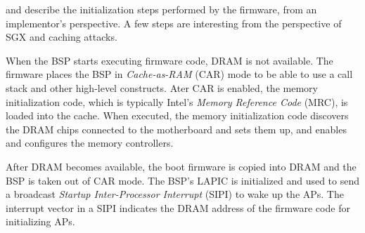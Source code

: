 \cite{intel2010booting} and \cite{coreboot2015manual} describe the
initialization steps performed by the firmware, from an implementor's
perspective. A few steps are interesting from the perspective of SGX and
caching attacks.


When the BSP starts executing firmware code, DRAM is not available. The
firmware places the BSP in \textit{Cache-as-RAM} (CAR) mode to be able to use a
call stack and other high-level constructs. Ater CAR is enabled, the memory
initialization code, which is typically Intel's \textit{Memory Reference Code}
(MRC), is loaded into the cache. When executed, the memory initialization code
discovers the DRAM chips connected to the motherboard and sets them up, and
enables and configures the memory controllers.

After DRAM becomes available, the boot firmware is copied into DRAM and the BSP
is taken out of CAR mode. The BSP's LAPIC is initialized and used to send a
broadcast \textit{Startup Inter-Processor Interrupt} (SIPI) to wake up the
APs. The interrupt vector in a SIPI indicates the DRAM address of the firmware
code for initializing APs.



